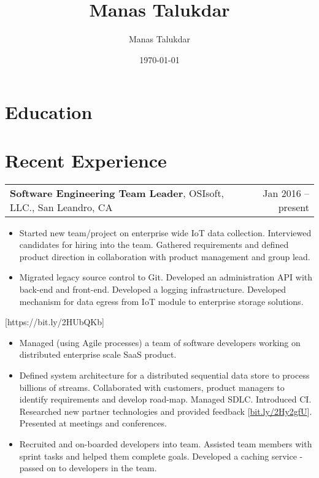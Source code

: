 \documentclass[letterpaper,10pt]{article}
\title{Manas Talukdar}
\author{Manas Talukdar}
\date{\today}
\makeatletter
\newcommand{\experienceItem}[3]{
	\begin{tabular*}{\textwidth}{c@{\extracolsep{\fill}}c}
		\multicolumn{1}{l}{\textbf{#1}, #2} & \multicolumn{1}{r}{#3}\\
	\end{tabular*}\vspace{-10pt}
}
\newcommand{\resumeItemListStart}{\begin{itemize}}
\newcommand{\resumeItemListEnd}{\end{itemize}}
\newcommand{\resumeListItem}[1]{
	\item{#1 \vspace{-6pt}}
}
\makeatother
\begin{document}
\thispagestyle{empty}
	
	
	
	
	
	\section{Education}	
	
	

	\section{Recent Experience}
	
	\experienceItem{Software Engineering Team Leader}{OSIsoft, LLC., San Leandro, CA}{Jan 2016 -- present}

	
	\resumeItemListStart
	\resumeListItem {Started new team/project on enterprise wide IoT data collection. Interviewed candidates for hiring into the team. Gathered requirements and defined product direction in collaboration with product management and group lead.}
	\resumeListItem {Migrated legacy source control to Git. Developed an administration API with back-end and front-end. Developed a logging infrastructure. Developed mechanism for data egress from IoT module to enterprise storage solutions.}
	\resumeItemListEnd

	[https://bit.ly/2HUbQKb]
	
	\resumeItemListStart
	\resumeListItem {Managed (using Agile processes) a team of software developers working on distributed enterprise scale SaaS product.}
	\resumeListItem {Defined system architecture for a distributed sequential data store to process billions of streams. Collaborated with customers, product managers to identify requirements and develop road-map. Managed SDLC. Introduced CI. Researched new partner technologies and provided feedback [\href{https://bit.ly/2Hy2gfU}{bit.ly/2Hy2gfU}]. Presented at meetings and conferences.}
	\resumeListItem {Recruited and on-boarded developers into team. Assisted team members with sprint tasks and helped them complete goals. Developed a caching service - passed on to developers in the team.}
	\resumeItemListEnd
\end{document}

